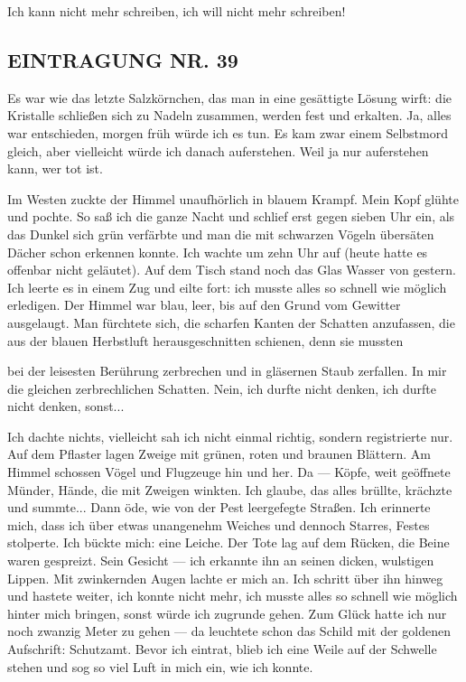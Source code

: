 Ich kann nicht mehr schreiben, ich will nicht mehr schreiben!

\subsection{EINTRAGUNG NR. 39}

Es war wie das letzte Salzkörnchen, das man in eine gesättigte
Lösung wirft: die Kristalle schließen sich zu Nadeln zusammen,
werden fest und erkalten. Ja, alles war entschieden, morgen früh
würde ich es tun. Es kam zwar einem Selbstmord gleich, aber
vielleicht würde ich danach auferstehen. Weil ja nur auferstehen
kann, wer tot ist.

Im Westen zuckte der Himmel unaufhörlich in blauem Krampf. Mein
Kopf glühte und pochte. So saß ich die ganze Nacht und schlief erst
gegen sieben Uhr ein, als das Dunkel sich grün verfärbte und man
die mit schwarzen Vögeln übersäten Dächer schon erkennen konnte.
Ich wachte um zehn Uhr auf (heute hatte es offenbar nicht
geläutet). Auf dem Tisch stand noch das Glas Wasser von gestern.
Ich leerte es in einem Zug und eilte fort: ich musste alles so
schnell wie möglich erledigen. Der Himmel war blau, leer, bis auf
den Grund vom Gewitter ausgelaugt. Man fürchtete sich, die scharfen
Kanten der Schatten anzufassen, die aus der blauen Herbstluft
herausgeschnitten schienen, denn sie mussten

bei der leisesten Berührung zerbrechen und in gläsernen Staub
zerfallen. In mir die gleichen zerbrechlichen Schatten. Nein, ich
durfte nicht denken, ich durfte nicht denken, sonst...

Ich dachte nichts, vielleicht sah ich nicht einmal richtig, sondern
registrierte nur. Auf dem Pflaster lagen Zweige mit grünen, roten
und braunen Blättern. Am Himmel schossen Vögel und Flugzeuge hin
und her. Da — Köpfe, weit geöffnete Münder, Hände, die mit Zweigen
winkten. Ich glaube, das alles brüllte, krächzte und summte... Dann
öde, wie von der Pest leergefegte Straßen. Ich erinnerte mich, dass
ich über etwas unangenehm Weiches und dennoch Starres, Festes
stolperte. Ich bückte mich: eine Leiche. Der Tote lag auf dem
Rücken, die Beine waren gespreizt. Sein Gesicht — ich erkannte ihn
an seinen dicken, wulstigen Lippen. Mit zwinkernden Augen lachte er
mich an. Ich schritt über ihn hinweg und hastete weiter, ich konnte
nicht mehr, ich musste alles so schnell wie möglich hinter mich
bringen, sonst würde ich zugrunde gehen. Zum Glück hatte ich nur
noch zwanzig Meter zu gehen — da leuchtete schon das Schild mit der
goldenen Aufschrift: Schutzamt. Bevor ich eintrat, blieb ich eine
Weile auf der Schwelle stehen und sog so viel Luft in mich ein, wie
ich konnte.

